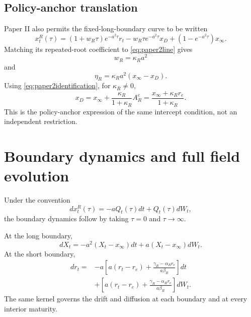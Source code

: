 \documentclass[11pt]{article}
\numberwithin{equation}{section}
\begin{document}
\subsection{Policy-anchor translation}

Paper II \cite{OzaShortBoundary} also permits the fixed-long-boundary curve to be written
\begin{equation}
 x_t^R(\tau)
 =(1+w_R\tau)e^{-a^2\tau}r_t
 -w_R\tau e^{-a^2\tau}x_D
 +(1-e^{-a^2\tau})x_\infty.
 \label{eq:policyanchor}
\end{equation}
Matching its repeated-root coefficient to \eqref{eq:paper2line} gives
\begin{equation}
 w_R=\kappa_Ra^2
\end{equation}
and
\begin{equation}
 \eta_R=\kappa_Ra^2(x_\infty-x_D).
\end{equation}
Using \eqref{eq:paper2identification}, for $\kappa_R\neq0$,
\begin{equation}
 {
 x_D=x_\infty+\frac{\kappa_R}{1+\kappa_R}A_R^e
 =\frac{x_\infty+\kappa_Rr_e}{1+\kappa_R}.
 }
\end{equation}
This is the policy-anchor expression of the same intercept condition, not an independent restriction.

\section{Boundary dynamics and full field evolution}

Under the convention
\begin{equation}
 dx_t^R(\tau)=-aQ_t(\tau)dt+Q_t(\tau)dW_t,
 \label{eq:fieldsde}
\end{equation}
the boundary dynamics follow by taking $\tau=0$ and $\tau\to\infty$.

At the long boundary,
\begin{equation}
 {
 dX_t
 =-a^2(X_t-x_\infty)dt
 +a(X_t-x_\infty)dW_t.
 }
 \label{eq:longsde}
\end{equation}
At the short boundary,
\begin{align}
 dr_t
 ={}&-a\left[
 a(r_t-r_e)+\frac{\gamma_R-\alpha_Rr_e}{a\beta_R}
 \right]dt
 \nonumber\\
 &+\left[
 a(r_t-r_e)+\frac{\gamma_R-\alpha_Rr_e}{a\beta_R}
 \right]dW_t.
 \label{eq:shortsde}
\end{align}
The same kernel governs the drift and diffusion at each boundary and at every interior maturity.
\end{document}
